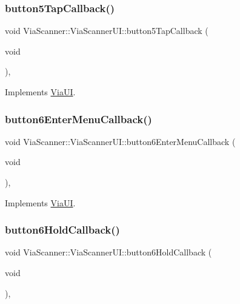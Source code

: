 \subsubsection{\texorpdfstring{button5\+Tap\+Callback()}{button5TapCallback()}}
{\footnotesize\ttfamily void Via\+Scanner\+::\+Via\+Scanner\+U\+I\+::button5\+Tap\+Callback (\begin{DoxyParamCaption}\item[{void}]{ }\end{DoxyParamCaption})\hspace{0.3cm}{\ttfamily [override]}, {\ttfamily [virtual]}}



Implements \mbox{\hyperlink{class_via_u_i_a5066c22385f31c24ec939d680a66a628}{Via\+UI}}.

\mbox{\label{class_via_scanner_1_1_via_scanner_u_i_a94de9ec6e40e16ba7dd8dc0ffb9adc14}} 
\subsubsection{\texorpdfstring{button6\+Enter\+Menu\+Callback()}{button6EnterMenuCallback()}}
{\footnotesize\ttfamily void Via\+Scanner\+::\+Via\+Scanner\+U\+I\+::button6\+Enter\+Menu\+Callback (\begin{DoxyParamCaption}\item[{void}]{ }\end{DoxyParamCaption})\hspace{0.3cm}{\ttfamily [override]}, {\ttfamily [virtual]}}



Implements \mbox{\hyperlink{class_via_u_i_ae59e7ff3a6ba1f641a4a916e47a26513}{Via\+UI}}.

\mbox{\label{class_via_scanner_1_1_via_scanner_u_i_af2cd0e1ac72f9486aa152b1d69bec8c8}} 
\subsubsection{\texorpdfstring{button6\+Hold\+Callback()}{button6HoldCallback()}}
{\footnotesize\ttfamily void Via\+Scanner\+::\+Via\+Scanner\+U\+I\+::button6\+Hold\+Callback (\begin{DoxyParamCaption}\item[{void}]{ }\end{DoxyParamCaption})\hspace{0.3cm}{\ttfamily [override]}, {\ttfamily [virtual]}}



